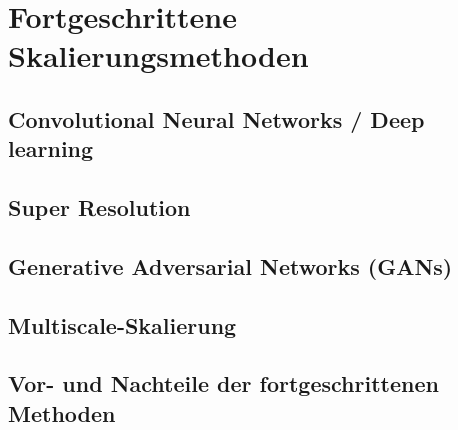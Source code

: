 
\chapter{Fortgeschrittene Skalierungsmethoden}

\section{Convolutional Neural Networks / Deep learning}
\section{Super Resolution}
\section{Generative Adversarial Networks (GANs)}
\section{Multiscale-Skalierung}
\section{Vor- und Nachteile der fortgeschrittenen Methoden}